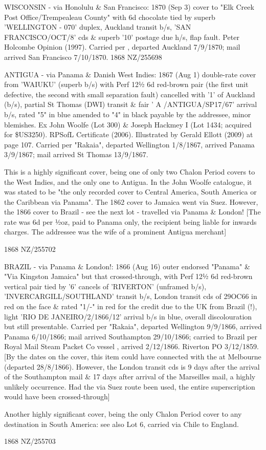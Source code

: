 \documentclass[justified]{tufte-book}
\begin{document}
%
{WISCONSIN - via Honolulu \& San Francisco: 1870 (Sep 3) cover to "Elk Creek Post Office/Trempealeau County" with 6d chocolate tied by superb 'WELLINGTON - 070' duplex, Auckland transit b/s, 'SAN FRANCISCO/OCT/8' cds \& superb '10' postage due h/s, flap fault. Peter Holcombe Opinion (1997). Carried per , departed Auckland 7/9/1870; mail arrived San Francisco 7/10/1870.}%
{1868}%
{NZ/255698}%
{}%
{}
{}%
{}

%
{ANTIGUA - via Panama \& Danish West Indies: 1867 (Aug 1) double-rate cover from 'WAIUKU' (superb b/s) with Perf 12½ 6d red-brown pair (the first unit defective, the second with small separation fault) cancelled with '1' of Auckland (b/s), partial St Thomas (DWI) transit \& fair ' A /ANTIGUA/SP17/67' arrival b/s, rated "5" in blue amended to "4" in black payable by the addressee, minor blemishes. Ex John Woolfe (Lot 300) \& Joseph Hackmey I (Lot 1434; acquired for \$US3250). RPSofL Certificate (2006). Illustrated by Gerald Ellott (2009) at page 107. Carried per "Rakaia", departed Wellington 1/8/1867, arrived Panama 3/9/1867; mail arrived St Thomas 13/9/1867. 

This is a highly significant cover, being one of only two Chalon Period covers to the West Indies, and the only one to Antigua. In the John Woolfe catalogue, it was stated to be "the only recorded cover to Central America, South America or the Caribbean via Panama". The 1862 cover to Jamaica went via Suez. However, the 1866 cover to Brazil - see the next lot - travelled via Panama \& London! [The rate was 6d per ½oz, paid to Panama only, the recipient being liable for inwards charges. The addressee was the wife of a prominent Antigua merchant]}%
{1868}%
{NZ/255702}%
{}%
{}
{}%
{}

%
{BRAZIL - via Panama \& London!: 1866 (Aug 16) outer endorsed "Panama" \& "Via Kingston Jamaica" but that crossed-through, with Perf 12½ 6d red-brown vertical pair tied by '6' cancels of 'RIVERTON' (unframed b/s), 'INVERCARGILL/SOUTHLAND' transit b/s, London transit cds of 29OC66 in red on the face \& rated "1/-" in red for the credit due to the UK from Brazil (!), light 'RIO DE JANEIRO/2/1866/12' arrival b/s in blue, overall discolouration but still presentable. Carried per "Rakaia", departed Wellington 9/9/1866, arrived Panama 6/10/1866; mail arrived Southampton 29/10/1866; carried to Brazil per Royal Mail Steam Packet Co vessel , arrived 2/12/1866. Riverton PO 3/12/1859. [By the dates on the cover, this item could have connected with the  at Melbourne (departed 28/8/1866). However, the London transit cds is 9 days after the arrival of the Southampton mail \& 17 days after arrival of the Marseilles mail, a highly unlikely occurrence. Had the via Suez route been used, the entire superscription would have been crossed-through]

Another highly significant cover, being the only Chalon Period cover to any destination in South America: see also Lot 6, carried via Chile to England.}%
{1868}%
{NZ/255703}%
{}%
{}
{}%
{}
\end{document}
